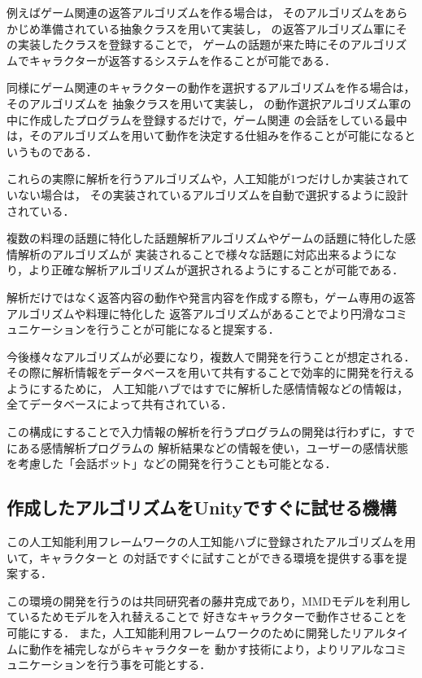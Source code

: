 例えばゲーム関連の返答アルゴリズムを作る場合は，
そのアルゴリズムをあらかじめ準備されている抽象クラスを用いて実装し，
の返答アルゴリズム軍にその実装したクラスを登録することで，
ゲームの話題が来た時にそのアルゴリズムでキャラクターが返答するシステムを作ることが可能である．

同様にゲーム関連のキャラクターの動作を選択するアルゴリズムを作る場合は，そのアルゴリズムを
抽象クラスを用いて実装し，
の動作選択アルゴリズム軍の中に作成したプログラムを登録するだけで，ゲーム関連
の会話をしている最中は，そのアルゴリズムを用いて動作を決定する仕組みを作ることが可能になるというものである．

これらの実際に解析を行うアルゴリズムや，人工知能が1つだけしか実装されていない場合は，
その実装されているアルゴリズムを自動で選択するように設計されている．

複数の料理の話題に特化した話題解析アルゴリズムやゲームの話題に特化した感情解析のアルゴリズムが
実装されることで様々な話題に対応出来るようになり，より正確な解析アルゴリズムが選択されるようにすることが可能である．

解析だけではなく返答内容の動作や発言内容を作成する際も，ゲーム専用の返答アルゴリズムや料理に特化した
返答アルゴリズムがあることでより円滑なコミュニケーションを行うことが可能になると提案する．

今後様々なアルゴリズムが必要になり，複数人で開発を行うことが想定される．
その際に解析情報をデータベースを用いて共有することで効率的に開発を行えるようにするために，
人工知能ハブではすでに解析した感情情報などの情報は，全てデータベースによって共有されている．

この構成にすることで入力情報の解析を行うプログラムの開発は行わずに，すでにある感情解析プログラムの
解析結果などの情報を使い，ユーザーの感情状態を考慮した「会話ボット」などの開発を行うことも可能となる．
\subsection{作成したアルゴリズムをUnityですぐに試せる機構}
この人工知能利用フレームワークの人工知能ハブに登録されたアルゴリズムを用いて，キャラクターと
の対話ですぐに試すことができる環境を提供する事を提案する．

この環境の開発を行うのは共同研究者の藤井克成であり，MMDモデルを利用しているためモデルを入れ替えることで
好きなキャラクターで動作させることを可能にする．
また，人工知能利用フレームワークのために開発したリアルタイムに動作を補完しながらキャラクターを
動かす技術により，よりリアルなコミュニケーションを行う事を可能とする．

